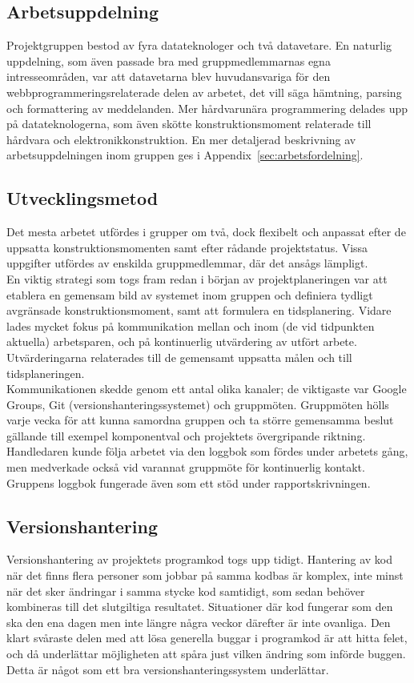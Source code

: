 \documentclass[a4paper,11pt]{article}
\begin{document}
\subsection{Arbetsuppdelning}
Projektgruppen bestod av fyra datateknologer och två datavetare. En naturlig uppdelning, som även passade bra med gruppmedlemmarnas egna intresseområden, var att datavetarna blev huvudansvariga för den webbprogrammeringsrelaterade delen av arbetet, det vill säga hämtning, parsing och formattering av meddelanden. Mer hårdvarunära programmering delades upp på datateknologerna, som även skötte konstruktionsmoment relaterade till hårdvara och elektronikkonstruktion. En mer detaljerad beskrivning av arbetsuppdelningen inom gruppen ges i Appendix~\ref{sec:arbetsfordelning}.

\subsection{Utvecklingsmetod}
Det mesta arbetet utfördes i grupper om två, dock flexibelt och anpassat efter de uppsatta konstruktionsmomenten samt efter rådande projektstatus. Vissa uppgifter utfördes av enskilda gruppmedlemmar, där det ansågs lämpligt.\\

En viktig strategi som togs fram redan i början av projektplaneringen var att etablera en gemensam bild av systemet inom gruppen och definiera tydligt avgränsade konstruktionsmoment, samt att formulera en tidsplanering. Vidare lades mycket fokus på kommunikation mellan och inom (de vid tidpunkten aktuella) arbetsparen, och på kontinuerlig utvärdering av utfört arbete. Utvärderingarna relaterades till de gemensamt uppsatta målen och till tidsplaneringen.\\

Kommunikationen skedde genom ett antal olika kanaler; de viktigaste var Google Groups, Git (versionshanteringssystemet) och gruppmöten. Gruppmöten hölls varje vecka för att kunna samordna gruppen och ta större gemensamma beslut gällande till exempel komponentval och projektets övergripande riktning. Handledaren kunde följa arbetet via den loggbok som fördes under arbetets gång, men medverkade också vid varannat gruppmöte för kontinuerlig kontakt. Gruppens loggbok fungerade även som ett stöd under rapportskrivningen.

\subsection{Versionshantering}
Versionshantering av projektets programkod togs upp tidigt. Hantering av kod när det finns flera personer som jobbar på samma kodbas är komplex, inte minst när det sker ändringar i samma stycke kod samtidigt, som sedan behöver kombineras till det slutgiltiga resultatet. Situationer där kod fungerar som den ska den ena dagen men inte längre några veckor därefter är inte ovanliga. Den klart svåraste delen med att lösa generella buggar i programkod är att hitta felet, och då underlättar möjligheten att spåra just vilken ändring som införde buggen. Detta är något som ett bra versionshanteringssystem underlättar.\\
\end{document}
